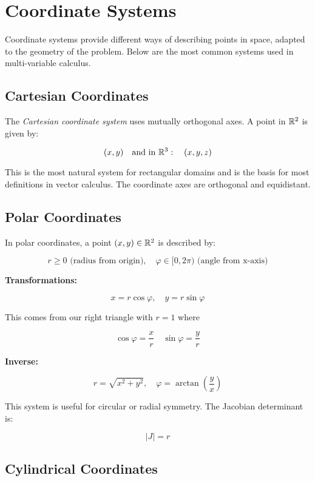 \newpage
\section{Coordinate Systems}

Coordinate systems provide different ways of describing points in space, adapted to the geometry of the 
problem. Below are the most common systems used in multi-variable calculus.

\subsection{Cartesian Coordinates}

The \emph{Cartesian coordinate system} uses mutually orthogonal axes. A point in \( \mathbb{R}^2 \) 
is given by:

\[
    (x, y) \quad \text{and in } \mathbb{R}^3: \quad (x, y, z)
\]

This is the most natural system for rectangular domains and is the basis for most definitions in vector 
calculus. The coordinate axes are orthogonal and equidistant.


\subsection{Polar Coordinates}

In polar coordinates, a point \( (x, y) \in \mathbb{R}^2 \) is described by:

\[
    r \ge 0 \text{ (radius from origin)}, \quad \varphi \in [0, 2\pi) \text{ (angle from x-axis)}
\]

\textbf{Transformations:}

\[
    x = r \cos \varphi, \quad y = r \sin \varphi
\]

This comes from our right triangle with \(r = 1\) where

\[
    \cos \varphi = \frac{x}{r} \quad \sin \varphi = \frac{y}{r}
\]

\textbf{Inverse:}

\[
    r = \sqrt{x^2 + y^2}, \quad \varphi = \arctan\left(\frac{y}{x}\right)
\]

This system is useful for circular or radial symmetry. The Jacobian determinant is:

\[
    |J| = r
\]

\subsection{Cylindrical Coordinates}


